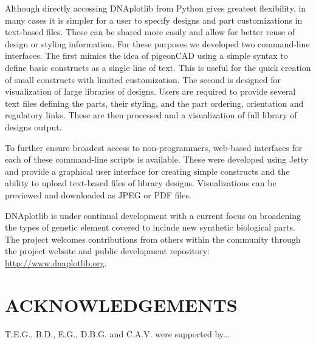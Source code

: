 \documentclass{bioinfo}
\begin{document}
Although directly accessing DNAplotlib from Python gives greatest flexibility, in many cases it is simpler for a user to specify designs and part customizations in text-based files. These can be shared more easily and allow for better reuse of design or styling information. For these purposes we developed two command-line interfaces. The first mimics the idea of pigeonCAD using a simple syntax to define basic constructs as a single line of text. This is useful for the quick creation of small constructs with limited customization. The second is designed for visualization of large libraries of designs. Users are required to provide several text files defining the parts, their styling, and the part ordering, orientation and regulatory links. These are then processed and a visualization of full library of designs output.

To further ensure broadest access to non-programmers, web-based interfaces for each of these command-line scripts is available. These were developed using Jetty and provide a graphical user interface for creating simple constructs and the ability to upload text-based files of library designs. Visualizations can be previewed and downloaded as JPEG or PDF files.

DNAplotlib is under continual development with a current focus on broadening the types of genetic element covered to include new synthetic biological parts. The project welcomes contributions from others within the community through the project website and public development repository: \href{http://www.dnaplotlib.org}{http://www.dnaplotlib.org}.

\section*{ACKNOWLEDGEMENTS}
T.E.G., B.D., E.G., D.B.G. and C.A.V. were supported by...
\end{document}
